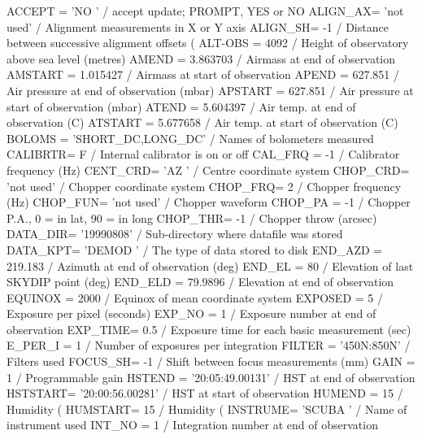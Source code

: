 \documentclass[twoside,11pt,nolof]{starlink}
\begin{document}
\begin{small}
\begin{terminalv}
ACCEPT  = 'NO      '           / accept update; PROMPT, YES or NO
ALIGN_AX= 'not used'           / Alignment measurements in X or Y axis
ALIGN_SH=                   -1 / Distance between successive alignment offsets (
ALT-OBS =                 4092 / Height of observatory above sea level (metres)
AMEND   =             3.863703 / Airmass at end of observation
AMSTART =             1.015427 / Airmass at start of observation
APEND   =              627.851 / Air pressure at end of observation (mbar)
APSTART =              627.851 / Air pressure at start of observation (mbar)
ATEND   =             5.604397 / Air temp. at end of observation (C)
ATSTART =             5.677658 / Air temp. at start of observation (C)
BOLOMS  = 'SHORT_DC,LONG_DC'   / Names of bolometers measured
CALIBRTR=                    F / Internal calibrator is on or off
CAL_FRQ =                   -1 / Calibrator frequency (Hz)
CENT_CRD= 'AZ      '           / Centre coordinate system
CHOP_CRD= 'not used'           / Chopper coordinate system
CHOP_FRQ=                    2 / Chopper frequency (Hz)
CHOP_FUN= 'not used'           / Chopper waveform
CHOP_PA =                   -1 / Chopper P.A., 0 = in lat, 90 = in long
CHOP_THR=                   -1 / Chopper throw (arcsec)
DATA_DIR= '19990808'           / Sub-directory where datafile was stored
DATA_KPT= 'DEMOD   '           / The type of data stored to disk
END_AZD =              219.183 / Azimuth at end of observation (deg)
END_EL  =                   80 / Elevation of last SKYDIP point (deg)
END_ELD =              79.9896 / Elevation at end of observation
EQUINOX =                 2000 / Equinox of mean coordinate system
EXPOSED =                    5 / Exposure per pixel (seconds)
EXP_NO  =                    1 / Exposure number at end of observation
EXP_TIME=                  0.5 / Exposure time for each basic measurement (sec)
E_PER_I =                    1 / Number of exposures per integration
FILTER  = '450N:850N'          / Filters used
FOCUS_SH=                   -1 / Shift between focus measurements (mm)
GAIN    =                    1 / Programmable gain
HSTEND  = '20:05:49.00131'     / HST at end of observation
HSTSTART= '20:00:56.00281'     / HST at start of observation
HUMEND  =                   15 / Humidity (%
HUMSTART=                   15 / Humidity (%
INSTRUME= 'SCUBA   '           / Name of instrument used
INT_NO  =                    1 / Integration number at end of observation

\end{terminalv}
\end{small}
\end{document}
